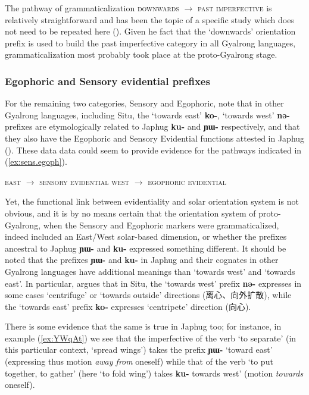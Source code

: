 \documentclass[oldfontcommands,oneside,a4paper,11pt]{article}
\newcommand{\ipa}[1]{\mbox{\phon\textbf{#1}}} %
\newcommand{\zh}[1]{{\cn #1}}
\begin{document}
The pathway of grammaticalization \textsc{downwards} $\rightarrow $ \textsc{past imperfective} is relatively straightforward and has been the topic of a specific study which does not need to be repeated here (\citealt{lin11direction}). Given he fact that the `downwards' orientation prefix is used to build the past imperfective category in all Gyalrong languages, grammaticalization most probably took place at the proto-Gyalrong stage.

\subsubsection{Egophoric and Sensory evidential prefixes}

For the remaining two categories, Sensory and Egophoric, note that in other Gyalrong languages, including Situ, the `towards east' \ipa{ko-}, `towards west' \ipa{nə-} prefixes are etymologically related to Japhug \ipa{ku-} and \ipa{ɲɯ-} respectively, and that they also have the Egophoric and Sensory Evidential functions attested in Japhug (\citealt{lin02dimension}). These data data could seem to provide evidence for the pathways indicated in (\ref{ex:sens.egoph}).


\begin{exe}
\ex \label{ex:sens.egoph}
\glt \textsc{east} $\rightarrow $ \textsc{sensory evidential} 
\glt \textsc{west} $\rightarrow $ \textsc{egophoric evidential}
\end{exe}

Yet, the functional link between evidentiality and solar orientation system is not obvious, and it is by no means certain that the orientation system of proto-Gyalrong, when the Sensory and Egophoric markers were grammaticalized, indeed included an East/West solar-based dimension, or whether the prefixes ancestral to Japhug \ipa{ɲɯ-} and \ipa{ku-} expressed something different.  It should be noted that the prefixes  \ipa{ɲɯ-} and \ipa{ku-} in Japhug and their cognates in other Gyalrong languages have additional meanings than `towards west' and `towards east'. In particular, \citet[228-9]{linxr93jiarong} argues that in Situ, the `towards west' prefix \ipa{nə-} expresses in some cases `centrifuge' or `towards outside' directions (\zh{离心、向外扩散}), while the `towards east' prefix \ipa{ko-} expresses `centripete' direction (\zh{向心}). 

There is some evidence that the same is true in Japhug too; for instance, in example (\ref{ex:YWqAt}) we see that the imperfective of the verb `to separate' (in this particular context, `spread wings') takes the prefix \ipa{ɲɯ-} `toward east' (expressing thus motion \textit{away from} oneself) while that of the verb `to put together, to gather' (here `to fold wing') takes \ipa{ku-}  towards west' (motion \textit{towards} oneself).
\end{document}
